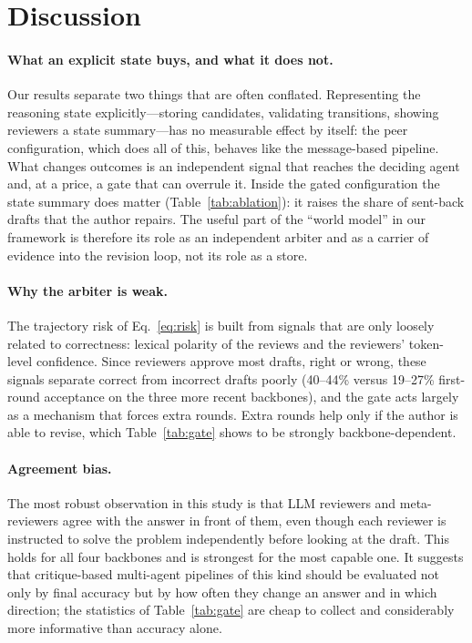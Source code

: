 \documentclass[lettersize,journal]{IEEEtran}
\begin{document}

\section{Discussion}
\label{sec:discussion}

\paragraph{What an explicit state buys, and what it does not.}
Our results separate two things that are often conflated. Representing the reasoning state explicitly---storing candidates, validating transitions, showing reviewers a state summary---has no measurable effect by itself: the peer configuration, which does all of this, behaves like the message-based pipeline. What changes outcomes is an independent signal that reaches the deciding agent and, at a price, a gate that can overrule it. Inside the gated configuration the state summary does matter (Table~\ref{tab:ablation}): it raises the share of sent-back drafts that the author repairs. The useful part of the ``world model'' in our framework is therefore its role as an independent arbiter and as a carrier of evidence into the revision loop, not its role as a store.

\paragraph{Why the arbiter is weak.}
The trajectory risk of Eq.~\eqref{eq:risk} is built from signals that are only loosely related to correctness: lexical polarity of the reviews and the reviewers' token-level confidence. Since reviewers approve most drafts, right or wrong, these signals separate correct from incorrect drafts poorly (40--44\% versus 19--27\% first-round acceptance on the three more recent backbones), and the gate acts largely as a mechanism that forces extra rounds. Extra rounds help only if the author is able to revise, which Table~\ref{tab:gate} shows to be strongly backbone-dependent.

\paragraph{Agreement bias.}
The most robust observation in this study is that LLM reviewers and meta-reviewers agree with the answer in front of them, even though each reviewer is instructed to solve the problem independently before looking at the draft. This holds for all four backbones and is strongest for the most capable one. It suggests that critique-based multi-agent pipelines of this kind should be evaluated not only by final accuracy but by how often they change an answer and in which direction; the statistics of Table~\ref{tab:gate} are cheap to collect and considerably more informative than accuracy alone.
\end{document}
